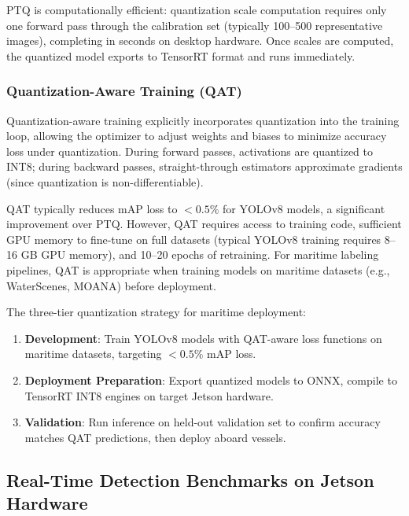 PTQ is computationally efficient: quantization scale computation requires only one forward pass through the calibration set (typically 100--500 representative images), completing in seconds on desktop hardware. Once scales are computed, the quantized model exports to TensorRT format and runs immediately.

\subsubsection{Quantization-Aware Training (QAT)}

Quantization-aware training explicitly incorporates quantization into the training loop, allowing the optimizer to adjust weights and biases to minimize accuracy loss under quantization. During forward passes, activations are quantized to INT8; during backward passes, straight-through estimators approximate gradients (since quantization is non-differentiable).

QAT typically reduces mAP loss to $< 0.5\%$ for YOLOv8 models, \cite{NVIDIA2024TensorRTModelOptimizer} a significant improvement over PTQ. However, QAT requires access to training code, sufficient GPU memory to fine-tune on full datasets (typical YOLOv8 training requires 8--16 GB GPU memory), and 10--20 epochs of retraining. For maritime labeling pipelines, QAT is appropriate when training models on maritime datasets (e.g., WaterScenes, MOANA) before deployment.

The three-tier quantization strategy for maritime deployment:
\begin{enumerate}
  \item \textbf{Development}: Train YOLOv8 models with QAT-aware loss functions on maritime datasets, targeting $< 0.5\%$ mAP loss.
  \item \textbf{Deployment Preparation}: Export quantized models to ONNX, compile to TensorRT INT8 engines on target Jetson hardware.
  \item \textbf{Validation}: Run inference on held-out validation set to confirm accuracy matches QAT predictions, then deploy aboard vessels.
\end{enumerate}



\subsection{Real-Time Detection Benchmarks on Jetson Hardware}

